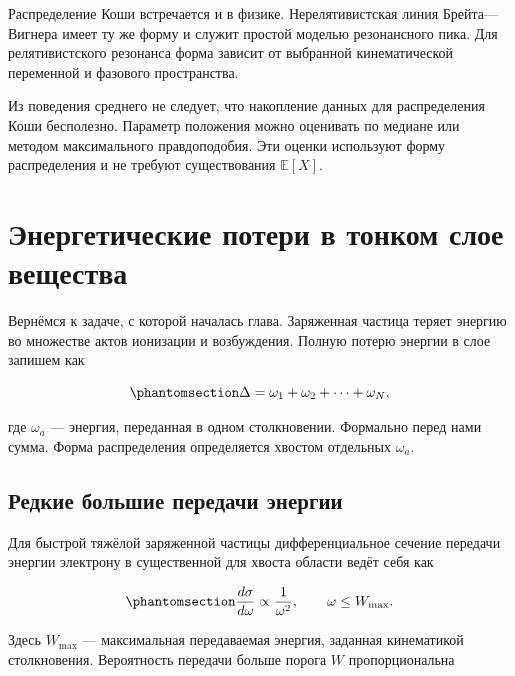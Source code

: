 \documentclass[
  russian,
  11pt,
  a4paper,
  open=any]{scrbook}
\begin{document}
Распределение Коши встречается и в физике. Нерелятивистская линия
Брейта---Вигнера имеет ту же форму и служит простой моделью резонансного
пика. Для релятивистского резонанса форма зависит от выбранной
кинематической переменной и фазового пространства.

Из поведения среднего не следует, что накопление данных для
распределения Коши бесполезно. Параметр положения можно оценивать по
медиане или методом максимального правдоподобия. Эти оценки используют
форму распределения и не требуют существования \(\mathbb E[X]\).

\section{Энергетические потери в тонком слое
вещества}\label{ux44dux43dux435ux440ux433ux435ux442ux438ux447ux435ux441ux43aux438ux435-ux43fux43eux442ux435ux440ux438-ux432-ux442ux43eux43dux43aux43eux43c-ux441ux43bux43eux435-ux432ux435ux449ux435ux441ux442ux432ux430}

Вернёмся к задаче, с которой началась глава. Заряженная частица теряет
энергию во множестве актов ионизации и возбуждения. Полную потерю
энергии в слое запишем как

\begin{equation}\protect\phantomsection\label{eq-ch5-energy-loss-sum}{
\Delta=\omega_1+\omega_2+\cdots+\omega_N,
}\end{equation}

где \(\omega_a\) --- энергия, переданная в одном столкновении. Формально
перед нами сумма. Форма распределения определяется хвостом отдельных
\(\omega_a\).

\subsection{Редкие большие передачи
энергии}\label{ux440ux435ux434ux43aux438ux435-ux431ux43eux43bux44cux448ux438ux435-ux43fux435ux440ux435ux434ux430ux447ux438-ux44dux43dux435ux440ux433ux438ux438}

Для быстрой тяжёлой заряженной частицы дифференциальное сечение передачи
энергии электрону в существенной для хвоста области ведёт себя как

\begin{equation}\protect\phantomsection\label{eq-ch5-energy-transfer-spectrum}{
\frac{d\sigma}{d\omega}\propto\frac1{\omega^2},
\qquad
\omega\le W_{\max}.
}\end{equation}

Здесь \(W_{\max}\) --- максимальная передаваемая энергия, заданная
кинематикой столкновения. Вероятность передачи больше порога \(W\)
пропорциональна
\end{document}
